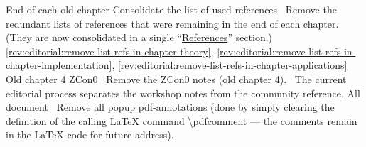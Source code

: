 End of each old chapter
\newcol Consolidate the list of used references
\newcol 
\newcol \Chan\ Remove the redundant lists of references that were remaining in the end of each chapter.
				(They are now consolidated in a single ``\hyperref[references]{References}'' section.)
\newcol \ref{rev:editorial:remove-list-refs-in-chapter-theory}, \ref{rev:editorial:remove-list-refs-in-chapter-implementation}, \ref{rev:editorial:remove-list-refs-in-chapter-applications}
\rowendL
Old chapter 4 ZCon0
\newcol 
\newcol {}
\newcol \Chan\ Remove the ZCon0 notes (old chapter 4). \Note\ The current editorial process separates the workshop notes from the community reference.
\newcol 
\rowendL
All document
\newcol 
\newcol {}
\newcol \Chan\ Remove all popup pdf-annotations (done by simply clearing the definition 
				of the calling LaTeX command \textbackslash{}pdfcomment --- the comments remain 
				in the LaTeX code for future address).
\newcol 
\rowendL
\myendIssue
